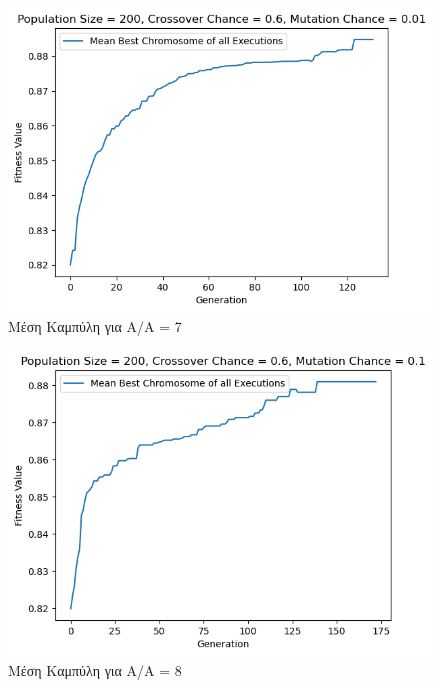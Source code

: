 \documentclass[12pt,a4paper]{article}
\begin{document}
\begin{figure}[H]
	\includegraphics[width=\textwidth]{Figures/13. Means for AA = 7.png}
	\caption{Μέση Καμπύλη για A/A = 7}
\end{figure}

\begin{figure}[H]
	\includegraphics[width=\textwidth]{Figures/15. Means for AA = 8.png}
	\caption{Μέση Καμπύλη για A/A = 8}
\end{figure}
\end{document}
